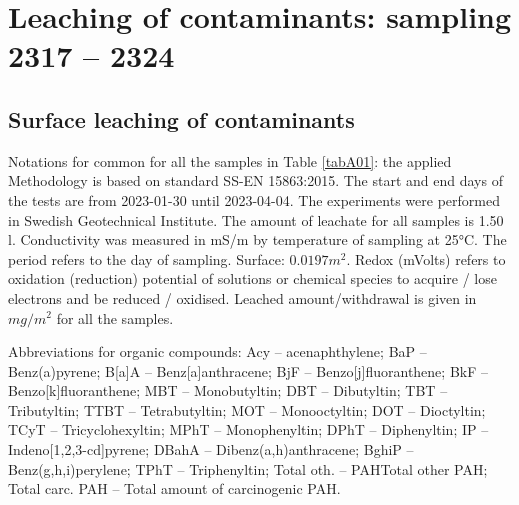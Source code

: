 \documentclass[algorithms,article,submit,pdftex,moreauthors]{Definitions/mdpi}
\begin{document}
\appendixstart
\appendix
\section[\appendixname~\thesection]{Leaching of contaminants: sampling 2317 -- 2324}\label{AppA1}
\subsection[\appendixname~\thesubsection]{Surface leaching of contaminants}

Notations for common for all the samples in Table \ref{tabA01}: the applied Methodology is based on standard SS-EN 15863:2015. The start and end days of the tests are from 2023-01-30 until 2023-04-04. The experiments were performed in Swedish Geotechnical Institute. The amount of leachate for all samples is 1.50 l. Conductivity was measured in mS/m by temperature of sampling at 25°C. The period refers to the day of sampling. Surface: $0.0197 m^2$. Redox (mVolts) refers to oxidation (reduction) potential of solutions or chemical species to acquire / lose electrons and be reduced / oxidised. Leached amount/withdrawal is given in $mg/m^2$ for all the samples. 

Abbreviations for organic compounds: Acy -- acenaphthylene; BaP -- Benz(a)pyrene; B[a]A -- Benz[a]anthracene; BjF -- Benzo[j]fluoranthene; BkF -- Benzo[k]fluoranthene; MBT -- Monobutyltin; DBT -- Dibutyltin; TBT -- Tributyltin; TTBT -- Tetrabutyltin; MOT -- Monooctyltin; DOT -- Dioctyltin; TCyT -- Tricyclohexyltin; MPhT -- Monophenyltin; DPhT -- Diphenyltin; IP -- Indeno[1,2,3-cd]pyrene; DBahA -- Dibenz(a,h)anthracene; BghiP -- Benz(g,h,i)perylene; TPhT -- Triphenyltin; Total oth. --  PAHTotal other PAH; Total carc. PAH -- Total amount of carcinogenic PAH. 
\end{document}
